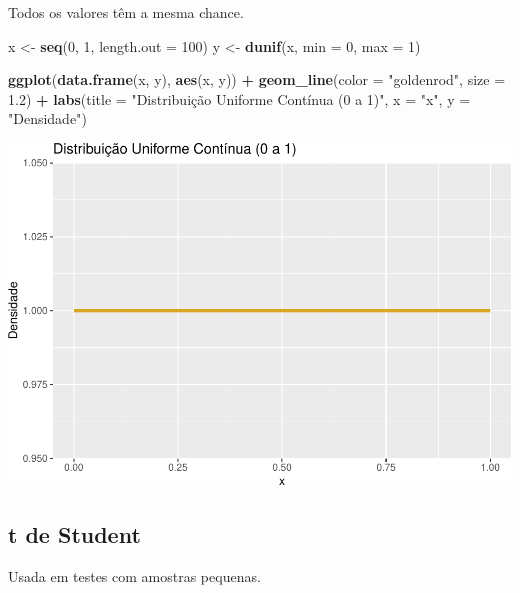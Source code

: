 \documentclass[
]{book}
\newenvironment{Shaded}{\begin{snugshade}}{\end{snugshade}}
\newcommand{\AttributeTok}[1]{\textcolor[rgb]{0.13,0.29,0.53}{#1}}
\newcommand{\DecValTok}[1]{\textcolor[rgb]{0.00,0.00,0.81}{#1}}
\newcommand{\FloatTok}[1]{\textcolor[rgb]{0.00,0.00,0.81}{#1}}
\newcommand{\FunctionTok}[1]{\textcolor[rgb]{0.13,0.29,0.53}{\textbf{#1}}}
\newcommand{\NormalTok}[1]{#1}
\newcommand{\OtherTok}[1]{\textcolor[rgb]{0.56,0.35,0.01}{#1}}
\newcommand{\SpecialCharTok}[1]{\textcolor[rgb]{0.81,0.36,0.00}{\textbf{#1}}}
\newcommand{\StringTok}[1]{\textcolor[rgb]{0.31,0.60,0.02}{#1}}
\begin{document}
Todos os valores têm a mesma chance.

\begin{Shaded}
\begin{Highlighting}[]
\NormalTok{x }\OtherTok{\textless{}{-}} \FunctionTok{seq}\NormalTok{(}\DecValTok{0}\NormalTok{, }\DecValTok{1}\NormalTok{, }\AttributeTok{length.out =} \DecValTok{100}\NormalTok{)}
\NormalTok{y }\OtherTok{\textless{}{-}} \FunctionTok{dunif}\NormalTok{(x, }\AttributeTok{min =} \DecValTok{0}\NormalTok{, }\AttributeTok{max =} \DecValTok{1}\NormalTok{)}

\FunctionTok{ggplot}\NormalTok{(}\FunctionTok{data.frame}\NormalTok{(x, y), }\FunctionTok{aes}\NormalTok{(x, y)) }\SpecialCharTok{+}
  \FunctionTok{geom\_line}\NormalTok{(}\AttributeTok{color =} \StringTok{"goldenrod"}\NormalTok{, }\AttributeTok{size =} \FloatTok{1.2}\NormalTok{) }\SpecialCharTok{+}
  \FunctionTok{labs}\NormalTok{(}\AttributeTok{title =} \StringTok{"Distribuição Uniforme Contínua (0 a 1)"}\NormalTok{, }\AttributeTok{x =} \StringTok{"x"}\NormalTok{, }\AttributeTok{y =} \StringTok{"Densidade"}\NormalTok{)}
\end{Highlighting}
\end{Shaded}

\includegraphics{LivroEstatisticaR_files/figure-latex/uniformeDist-1.pdf}

\subsection{t de Student}\label{t-de-student}

Usada em testes com amostras pequenas.
\end{document}
